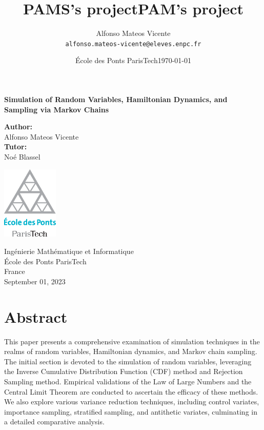 \documentclass{article}
\title{PAMS's project} %
\author{Alfonso Mateos Vicente\\ \texttt{alfonso.mateos-vicente@eleves.enpc.fr}} %
\date{École des Ponts ParisTech} %
\title{PAM's project}
\date{\today}
\begin{document}
\begin{titlepage}
    \begin{center}
        \vspace*{1cm}
        
        \Huge
        \textbf{Simulation of Random Variables, Hamiltonian Dynamics, and Sampling via Markov Chains}
        
        \vspace{1.5cm}

        \Large
        \textbf{Author:} \\
        \vspace{0.25cm}
        \LARGE
        Alfonso Mateos Vicente \\
        \vspace{0.5cm}
        \Large
        \textbf{Tutor:} \\
        \vspace{0.25cm}
        \LARGE
        Noé Blassel

        \vfill
        
        \includegraphics[width=0.2\textwidth]{./logo-enpc.eps}
        
        \vspace{1cm}
        
        \normalsize
        Ingénierie Mathématique et Informatique \\
        École des Ponts ParisTech \\
        France \\
        September 01, 2023
    \end{center}
    \restoregeometry
\end{titlepage}


\newpage
\tableofcontents
\newpage

\section*{Abstract}

This paper presents a comprehensive examination of simulation techniques in the realms of random variables, Hamiltonian dynamics, and Markov chain sampling. The initial section is devoted to the simulation of random variables, leveraging the Inverse Cumulative Distribution Function (CDF) method and Rejection Sampling method. Empirical validations of the Law of Large Numbers and the Central Limit Theorem are conducted to ascertain the efficacy of these methods. We also explore various variance reduction techniques, including control variates, importance sampling, stratified sampling, and antithetic variates, culminating in a detailed comparative analysis.
\end{document}
